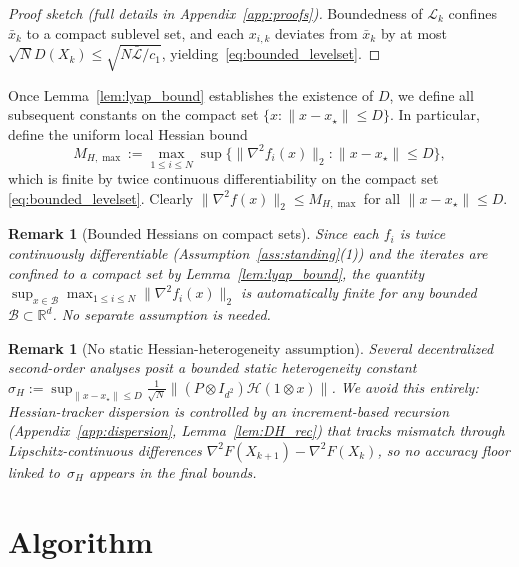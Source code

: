 \documentclass[10pt,twocolumn,letterpaper]{article}
\def\one{1}%
\def\J{J}%
\def\Pmat{P}%
\theoremstyle{compact}
\theoremstyle{compactremark}
\newtheorem{remark}[theorem]{Remark}
\newcommand{\R}{\mathbb{R}}
\newcommand{\one}{\mathbf{1}}
\newcommand{\J}{\left(\frac{1}{N}\one\one^\top\right)}
\newcommand{\Pmat}{I-\J}
\begin{document}
\begin{proof}[Proof sketch (full details in Appendix~\ref{app:proofs})]
	Boundedness of $\mathcal L_k$ confines $\bar x_k$ to a compact sublevel set,
	and each $x_{i,k}$ deviates from $\bar x_k$ by at most
	$\sqrt{N}D(X_k)\le\sqrt{N\bar{\mathcal L}/c_1}$,
	yielding~\eqref{eq:bounded_levelset}.
	\end{proof}

	Once Lemma~\ref{lem:lyap_bound} establishes the existence of $D$,
	we define all subsequent constants on the compact set $\{x:\|x-x_\star\|\le D\}$.
	In particular, define the uniform local Hessian bound
	\begin{equation}\label{eq:MHmax_def}
		M_{H,\max}\!:=\!\max_{1\le i\le N}\sup\{\|\nabla^2 f_i(x)\|_2:\|x\!-\!x_\star\|\!\le\! D\},
	\end{equation}
	which is finite by twice continuous differentiability on the compact set \eqref{eq:bounded_levelset}.
	Clearly $\|\nabla^2 f(x)\|_2\le M_{H,\max}$ for all $\|x-x_\star\|\le D$.

	\begin{remark}[Bounded Hessians on compact sets]
		Since each $f_i$ is twice continuously differentiable (Assumption~\ref{ass:standing}(1))
		and the iterates are confined to a compact set by Lemma~\ref{lem:lyap_bound},
		the quantity $\sup_{x\in\mathcal B}\max_{1\le i\le N}\|\nabla^2 f_i(x)\|_2$
		is automatically finite for any bounded $\mathcal B\subset\R^d$.
		No separate assumption is needed.
	\end{remark}

	\begin{remark}[No static Hessian-heterogeneity assumption]
		Several decentralized second-order analyses posit a bounded
		\emph{static} heterogeneity constant
		$\sigma_H:=\sup_{\|x-x_\star\|\le D}
		  \frac{1}{\sqrt N}\|(\Pmat\otimes I_{d^2})\mathcal H(\one\otimes x)\|$.
		We avoid this entirely: Hessian-tracker dispersion is controlled
		by an increment-based recursion
		(Appendix~\ref{app:dispersion}, Lemma~\ref{lem:DH_rec})
		that tracks mismatch through Lipschitz-continuous
		\emph{differences} $\nabla^2 F(X_{k+1})-\nabla^2 F(X_k)$,
		so no accuracy floor linked to~$\sigma_H$ appears in the
		final bounds.
	\end{remark}

	
	
\section{Algorithm}\label{sec:alg}
	
\end{document}

